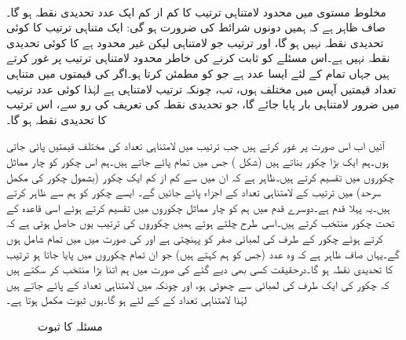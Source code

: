 \quad {}\\
مخلوط مستوی میں محدود لامتناہی ترتیب  کا کم از کم ایک عدد تحدیدی نقطہ ہو گا۔
\quad
صاف ظاہر ہے کہ ہمیں دونوں شرائط کی ضرورت ہو گی: ایک متناہی ترتیب کا کوئی تحدیدی نقطہ نہیں ہو گا، اور ترتیب  جو لامتناہی لیکن غیر محدود ہے کا کوئی تحدیدی نقطہ نہیں ہے۔اس مسئلے کو ثابت کرنے کی خاطر محدود لامتناہی ترتیب  پر غور کرتے ہیں جہاں تمام  کے لئے  ایسا عدد ہے جو  کو مطمئن کرتا ہو۔اگر  کی قیمتوں میں متناہی تعداد قیمتیں آپس میں مختلف ہوں، تب، چونکہ ترتیب لامتناہی ہے لہٰذا کوئی عدد  ترتیب میں ضرور لامتناہی بار پایا جائے گا، جو  تحدیدی نقطہ کی تعریف کی رو سے، اس ترتیب کا تحدیدی نقطہ ہو گا۔

آئیں اب اس صورت پر غور کرتے ہیں جب ترتیب میں لامتناہی تعداد کی مختلف قیمتیں پائی جاتی ہوں۔ہم ایک بڑا چکور  بناتے ہیں  (شکل ) جس میں تمام  پائے جاتے ہیں۔ہم اس چکور کو چار مماثل  چکوروں میں تقسیم کرتے ہیں۔ظاہر ہے کہ ان میں سے کم از کم ایک چکور (بشمول چکور کی مکمل سرحد) میں ترتیب کے لامتناہی تعداد کے اجزاء پائے جائیں گے۔ ایسے چکور کو ہم  سے ظاہر کرتے ہیں۔یہ پہلا قدم ہے۔دوسرے قدم میں ہم  کو چار مماثل چکوروں میں تقسیم کرتے ہوئے اسی قاعدہ کے تحت چکور  منتخب کرتے ہیں۔اسی طرح چلتے ہوئے ہمیں چکوروں کی ترتیب 
 یوں حاصل ہوتی ہے کہ  کرتے ہوئے چکور  کے طرف کی لمبائی صفر کو پہنچتی ہے اور  کی صورت میں  میں تمام  شامل ہوں گے۔یہاں صاف ظاہر ہے کہ  وہ عدد (جس کو ہم  کہتے ہیں) جو ان تمام چکوروں میں پایا جاتا ہو ترتیب کا تحدیدی نقطہ ہو گا۔درحقیقت کسی بھی دیے گئے  کی صورت میں ہم  اتنا بڑا منتخب کر سکتے ہیں کہ  چکور  کی  ایک طرف کی لمبائی  سے چھوٹی ہو، اور چونکہ  میں لامتناہی تعداد کے  پائے جاتے ہیں لہٰذا  لامتناہی تعداد کے  کے لئے  ہو گا۔یوں ثبوت مکمل ہوتا ہے۔
\begin{figure}
\centering
{}
\caption{مسئلہ  کا ثبوت}
\label{شکل_مسئلہ_ترتیب_بلزانو_وائشسٹراس}
\end{figure}

